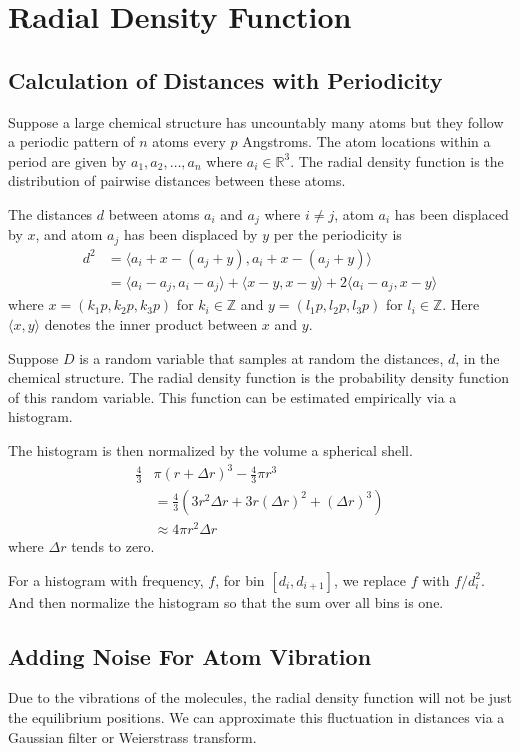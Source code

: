 \documentclass[12pt,letterpaper]{article}
\begin{document}
\tableofcontents
\setlength{\parindent}{0.25in}
\setlength{\floatsep}{0in}
\section{Radial Density Function}
\subsection{Calculation of Distances with Periodicity}
Suppose a large chemical structure has uncountably many atoms but they follow a
periodic pattern of $n$ atoms every $p$ Angstroms. The atom locations within a
period are given by $a_1, a_2, \ldots, a_n$ where $a_i \in \mathbb{R}^3$. The
radial density function is the distribution of pairwise distances between these
atoms.

The distances $d$ between atoms $a_i$ and $a_j$ where $i \neq j$, atom $a_i$
has been displaced by $x$, and atom $a_j$ has been displaced by $y$ per the
periodicity is 
\begin{align*}
  d^2 &= \langle a_i + x - (a_j + y), a_i + x - (a_j + y) \rangle \\
      &= \langle a_i-a_j, a_i-a_j \rangle  + \langle x-y, x-y \rangle  
      + 2 \langle a_i-a_j,x-y \rangle 
\end{align*}
where $x =(k_1 p, k_2 p, k_3 p)$ for $k_i \in \mathbb{Z}$ 
and $y = (l_1 p, l_2 p, l_3 p)$ for $l_i \in \mathbb{Z}$.
Here $\langle x,y \rangle $ denotes the inner product between $x$ and $y$. 

Suppose $D$ is a random variable that samples at random the distances, $d$, in
the chemical structure. The radial density function is the probability density
function of this random variable. This function can be estimated empirically via
a histogram.

The histogram is then normalized by the volume a spherical shell.
\begin{align*}
  \frac{4}{3} &\pi (r + \Delta r)^3 - \frac{4}{3} \pi r^3\\
     &=\frac{4}{3} (3 r^2 \Delta r + 3 r (\Delta r)^2 + (\Delta r)^3) \\
              &\approx 4 \pi r^2 \Delta r
\end{align*}
where $\Delta r$ tends to zero.

For a histogram with frequency, $f$, for bin $[d_i, d_{i+1}]$, we replace $f$
with $f / d_i^2$. And then normalize the histogram so that the sum over all bins
is one.

\subsection{Adding Noise For Atom Vibration}
Due to the vibrations of the molecules, the radial density function will not be
just the equilibrium positions. We can approximate this fluctuation in distances
via a Gaussian filter or Weierstrass transform.
\end{document}
